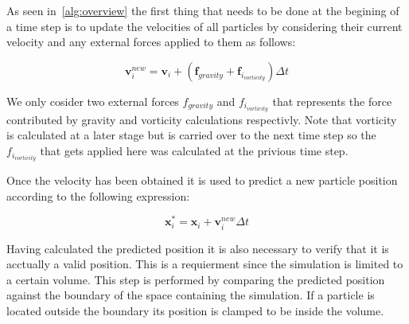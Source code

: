 As seen in~\ref{alg:overview} the first thing that needs to be done at the
begining of a time step is to update the velocities of all particles by
considering their current velocity and any external forces applied to them as follows:

\begin{equation}
\label{eq:velocity}
\mathbf{v}_{i}^{new} = \mathbf{v}_{i} + (\mathbf{f}_{gravity} + \mathbf{f}_{i_{vorticity}})\Delta t
\end{equation}

We only cosider two external forces $ f_{gravity} $ and $ f_{i_{vorticity}} $
that represents the force contributed by gravity and vorticity calculations
respectivly. Note that vorticity is calculated at a later stage but is carried
over to the next time step so the $ f_{i_{vorticity}} $ that gets applied here
was calculated at the privious time step.

Once the velocity has been obtained it is used to predict a new particle
position according to the following expression:

\begin{equation}
\label{eq:predict}
\mathbf{x}_{i}^{*}= \mathbf{x}_{i} + \mathbf{v}_{i}^{new} \Delta t
\end{equation}

Having calculated the predicted position it is also necessary to verify that it
is acctually a valid position. This is a requierment since the simulation is
limited to a certain volume. This step is performed by comparing the predicted
position against the boundary of the space containing the simulation. If a
particle is located outside the boundary its position is clamped to be inside
the volume.
